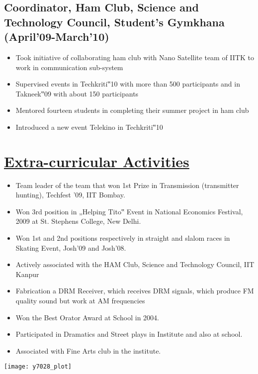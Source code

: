 \documentclass[12pt]{article}
\begin{document}
\subsection*{Coordinator, Ham Club, Science and Technology Council, Student’s Gymkhana (April’09-March’10)}
\begin{itemize}
	\item Took initiative of collaborating ham club with Nano Satellite team of IITK to work in communication sub-system
	\item Supervised events in Techkriti‟10 with more than 500 participants and in Takneek‟09 with about 150 participants
	\item Mentored fourteen students in completing their summer project in ham club
	\item Introduced a new event Telekino in Techkriti‟10
\end{itemize}

\section*{\underline {Extra-curricular Activities}}
\begin{itemize}
	\item Team leader of the team that won 1st Prize in Transmission (transmitter hunting), Techfest ’09, IIT Bombay.
	\item Won 3rd position in „Helping Tito‟ Event in National Economics Festival, 2009 at St. Stephens College, New Delhi.
	\item Won 1st and 2nd positions respectively in straight and slalom races in Skating Event, Josh’09 and Josh’08.
	\item Actively associated with the HAM Club, Science and Technology Council, IIT Kanpur
	\item Fabrication a DRM Receiver, which receives DRM signals, which produce FM quality sound but work at AM frequencies
	\item Won the Best Orator Award at School in 2004.
	\item Participated in Dramatics and Street plays in Institute and also at school.
	\item Associated with Fine Arts club in the institute.
\end{itemize}

\texttt{[image: y7028\_plot]}


	





		
\end{document}
